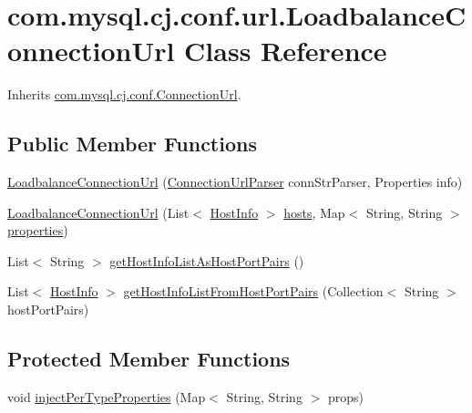 \hypertarget{classcom_1_1mysql_1_1cj_1_1conf_1_1url_1_1_loadbalance_connection_url}{}\section{com.\+mysql.\+cj.\+conf.\+url.\+Loadbalance\+Connection\+Url Class Reference}
\label{classcom_1_1mysql_1_1cj_1_1conf_1_1url_1_1_loadbalance_connection_url}


Inherits \mbox{\hyperlink{classcom_1_1mysql_1_1cj_1_1conf_1_1_connection_url}{com.\+mysql.\+cj.\+conf.\+Connection\+Url}}.

\subsection*{Public Member Functions}
\begin{DoxyCompactItemize}
\item 
\mbox{\hyperlink{classcom_1_1mysql_1_1cj_1_1conf_1_1url_1_1_loadbalance_connection_url_a4605af8a5c29a64ccae2a95c7939aa0e}{Loadbalance\+Connection\+Url}} (\mbox{\hyperlink{classcom_1_1mysql_1_1cj_1_1conf_1_1_connection_url_parser}{Connection\+Url\+Parser}} conn\+Str\+Parser, Properties info)
\item 
\mbox{\hyperlink{classcom_1_1mysql_1_1cj_1_1conf_1_1url_1_1_loadbalance_connection_url_a8e0a1ab2578683671fdad2dea60f78cc}{Loadbalance\+Connection\+Url}} (List$<$ \mbox{\hyperlink{classcom_1_1mysql_1_1cj_1_1conf_1_1_host_info}{Host\+Info}} $>$ \mbox{\hyperlink{classcom_1_1mysql_1_1cj_1_1conf_1_1_connection_url_ab774f53dab294218bc6b2cf1af73a905}{hosts}}, Map$<$ String, String $>$ \mbox{\hyperlink{classcom_1_1mysql_1_1cj_1_1conf_1_1_connection_url_afc53ba40da35bf161d2df6fbd785b09b}{properties}})
\item 
List$<$ String $>$ \mbox{\hyperlink{classcom_1_1mysql_1_1cj_1_1conf_1_1url_1_1_loadbalance_connection_url_aef6df049be461b78b04250d9af6b1c11}{get\+Host\+Info\+List\+As\+Host\+Port\+Pairs}} ()
\item 
List$<$ \mbox{\hyperlink{classcom_1_1mysql_1_1cj_1_1conf_1_1_host_info}{Host\+Info}} $>$ \mbox{\hyperlink{classcom_1_1mysql_1_1cj_1_1conf_1_1url_1_1_loadbalance_connection_url_ae11ed3f5bc2bbc455c5c311d1b783a60}{get\+Host\+Info\+List\+From\+Host\+Port\+Pairs}} (Collection$<$ String $>$ host\+Port\+Pairs)
\end{DoxyCompactItemize}
\subsection*{Protected Member Functions}
\begin{DoxyCompactItemize}
\item 
void \mbox{\hyperlink{classcom_1_1mysql_1_1cj_1_1conf_1_1url_1_1_loadbalance_connection_url_a01cbac35769ac60701e6ca72290025bd}{inject\+Per\+Type\+Properties}} (Map$<$ String, String $>$ props)
\end{DoxyCompactItemize}
